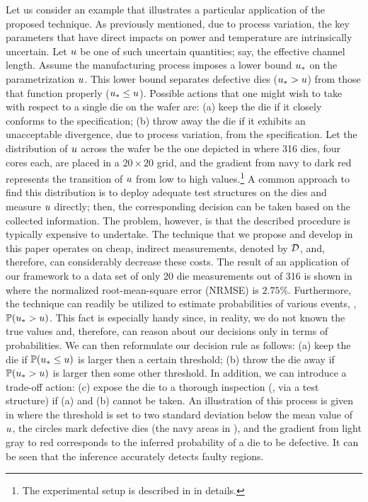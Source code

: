 
Let us consider an example that illustrates a particular application of the proposed technique. As previously mentioned, due to process variation, the key parameters that have direct impacts on power and temperature are intrinsically uncertain. Let $u$ be one of such uncertain quantities; say, the effective channel length. Assume the manufacturing process imposes a lower bound $u_*$ on the parametrization $u$. This lower bound separates defective dies ($u_* > u$) from those that function properly ($u_* \leq u$). Possible actions that one might wish to take with respect to a single die on the wafer are: (a) keep the die if it closely conforms to the specification; (b) throw away the die if it exhibits an unacceptable divergence, due to process variation, from the specification. Let the distribution of $u$ across the wafer be the one depicted in  where 316 dies, four cores each, are placed in a $20 \times 20$ grid, and the gradient from navy to dark red represents the transition of $u$ from low to high values.\footnote{The experimental setup is described in  in details.} A common approach to find this distribution is to deploy adequate test structures on the dies and measure $u$ directly; then, the corresponding decision can be taken based on the collected information. The problem, however, is that the described procedure is typically expensive to undertake. The technique that we propose and develop in this paper operates on cheap, indirect measurements, denoted by $\mathcal{D}$, and, therefore, can considerably decrease these costs. The result of an application of our framework to a data set of only 20 die measurements out of 316 is shown in  where the normalized root-mean-square error (NRMSE) is $2.75\%$. Furthermore, the technique can readily be utilized to estimate probabilities of various events, \eg, $\mathbb{P}(u_* > u)$. This fact is especially handy since, in reality, we do not known the true values and, therefore, can reason about our decisions only in terms of probabilities. We can then reformulate our decision rule as follows: (a) keep the die if $\mathbb{P}(u_* \leq u)$ is larger then a certain threshold; (b) throw the die away if $\mathbb{P}(u_* > u)$ is larger then some other threshold. In addition, we can introduce a trade-off action: (c) expose the die to a thorough inspection (\eg, via a test structure) if (a) and (b) cannot be taken. An illustration of this process is given in  where the threshold is set to two standard deviation below the mean value of $u$, the circles mark defective dies (the navy areas in ), and the gradient from light gray to red corresponds to the inferred probability of a die to be defective. It can be seen that the inference accurately detects faulty regions.

